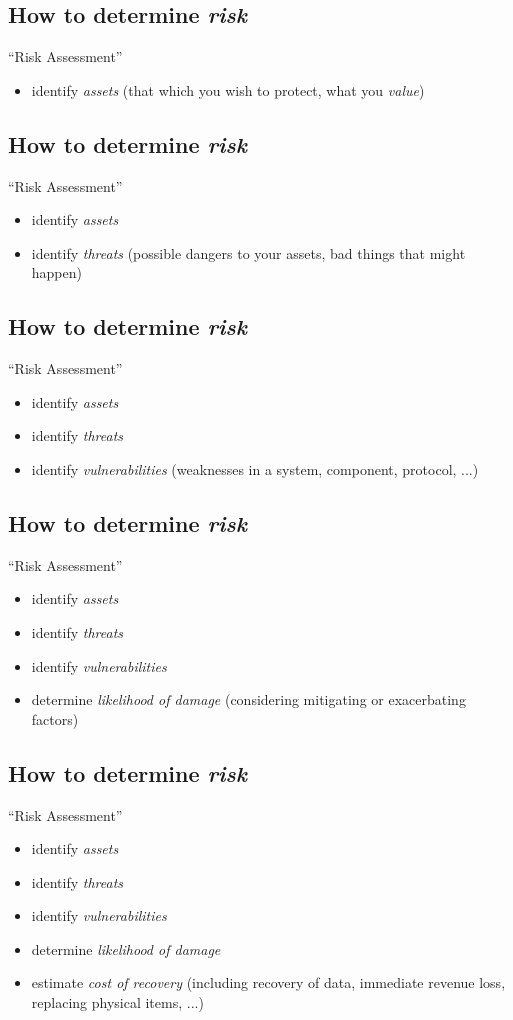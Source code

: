 \documentclass[xga]{xdvislides}
\begin{document}
\subsection{How to determine {\em risk}}
``Risk Assessment''
\begin{itemize}
	\item identify {\em assets} (that which you wish to protect, what you {\em value})
\end{itemize}

\subsection{How to determine {\em risk}}
``Risk Assessment''
\begin{itemize}
	\item identify {\em assets}
	\item identify {\em threats} (possible dangers to your assets, bad things that might happen)
\end{itemize}


\subsection{How to determine {\em risk}}
``Risk Assessment''
\begin{itemize}
	\item identify {\em assets}
	\item identify {\em threats}
	\item identify {\em vulnerabilities} (weaknesses in a system, component, protocol, ...)
\end{itemize}

\subsection{How to determine {\em risk}}
``Risk Assessment''
\begin{itemize}
	\item identify {\em assets}
	\item identify {\em threats}
	\item identify {\em vulnerabilities}
	\item determine {\em likelihood of damage} (considering mitigating or exacerbating factors)
\end{itemize}

\subsection{How to determine {\em risk}}
``Risk Assessment''
\begin{itemize}
	\item identify {\em assets}
	\item identify {\em threats}
	\item identify {\em vulnerabilities}
	\item determine {\em likelihood of damage}
	\item estimate {\em cost of recovery} (including recovery of data, immediate revenue loss, replacing physical items, ...)
\end{itemize}
\end{document}
